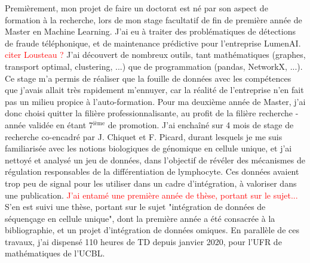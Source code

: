 \documentclass[a4paper,11pt]{article}
\begin{document}
Premièrement, mon projet de faire un doctorat est né par son aspect de formation à la recherche, lors de mon stage facultatif de fin de première année de Master en Machine Learning.%
J'ai eu à traiter des problématiques de détections de fraude téléphonique, et de maintenance prédictive pour l'entreprise LumenAI. \textcolor{red}{citer Lousteau ?} J'ai découvert de nombreux outils, tant mathématiques (graphes, transport optimal, clustering, ...) que de programmation (pandas, NetworkX, ...). %
Ce stage m'a permis de réaliser que la fouille de données avec les compétences que j'avais allait très rapidement m'ennuyer, car la réalité de l'entreprise n'en fait pas un milieu propice à l'auto-formation.
%
Pour ma deuxième année de Master, j'ai donc choisi quitter la filière professionnalisante, au profit de la filière recherche - année validée en étant 7$^{\text{ième}}$ de promotion. 
J'ai enchaîné sur 4 mois de stage de recherche co-encadré par J. Chiquet et F. Picard, durant lesquels je me suis familiarisée avec les notions biologiques de génomique en cellule unique, et j'ai nettoyé et analysé un jeu de données, dans l'objectif de révéler des mécanismes de régulation responsables de la différentiation de lymphocyte. Ces données avaient trop peu de signal pour les utiliser dans un cadre d'intégration, à valoriser dans une publication. \textcolor{red}{J'ai entamé une première année de thèse, portant sur le sujet...} S'en est suivi une thèse, portant sur le sujet "intégration de données de séquençage en cellule unique", dont la première année a été consacrée à la bibliographie, et un projet d'intégration de données omiques. %
En parallèle de ces travaux, j'ai dispensé %
110 heures de TD depuis janvier 2020, pour l'UFR de mathématiques de l'UCBL. 
\end{document}

